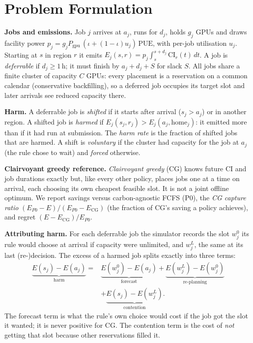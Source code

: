 \section{Problem Formulation}\label{sec:problem}

\textbf{Jobs and emissions.}
Job $j$ arrives at $a_j$, runs for $d_j$, holds $g_j$ GPUs and draws facility power
$p_j = g_j P_{\mathrm{gpu}}\,(\iota + (1-\iota)u_j)\,\mathrm{PUE}$, with per-job utilisation $u_j$.
Starting at $s$ in region $r$ it emits
$E_j(s,r) = p_j \int_s^{s+d_j} \mathrm{CI}_r(t)\,dt$.
A job is \emph{deferrable} if $d_j \ge 1$\,h; it must finish by $a_j + d_j + S$ for slack $S$.
All jobs share a finite cluster of capacity $C$ GPUs: every placement is a reservation on a common
calendar (conservative backfilling), so a deferred job occupies its target slot and later arrivals
see reduced capacity there.

\textbf{Harm.}
A deferrable job is \emph{shifted} if it starts after arrival ($s_j > a_j$) or in another region.
A shifted job is \emph{harmed} if $E_j(s_j, r_j) > E_j(a_j, \mathrm{home}_j)$: it emitted more than
if it had run at submission. The \emph{harm rate} is the fraction of shifted jobs that are harmed.
A shift is \emph{voluntary} if the cluster had capacity for the job at $a_j$ (the rule chose to
wait) and \emph{forced} otherwise.

\textbf{Clairvoyant greedy reference.} \emph{Clairvoyant greedy} (CG) knows future CI and job
durations exactly but, like every other policy, places jobs one at a time on arrival, each choosing
its own cheapest feasible slot. It is not a joint offline optimum. We report savings versus
carbon-agnostic FCFS (P0), the \emph{CG capture ratio} $(E_{P0}-E)/(E_{P0}-E_{\mathrm{CG}})$ (the
fraction of CG's saving a policy achieves), and regret $(E-E_{\mathrm{CG}})/E_{P0}$.

\textbf{Attributing harm.}
For each deferrable job the simulator records the slot $w^0_j$ its rule would choose at arrival
if capacity were unlimited, and $w^L_j$, the same at its last (re-)decision. The excess of a harmed
job splits exactly into three terms:
\begin{equation}\label{eq:decomp}
\begin{aligned}
\underbrace{E(s_j)-E(a_j)}_{\text{harm}} ={}&
\underbrace{E(w^0_j)-E(a_j)}_{\text{forecast}} +
\underbrace{E(w^L_j)-E(w^0_j)}_{\text{re-planning}}\\
&+ \underbrace{E(s_j)-E(w^L_j)}_{\text{contention}} .
\end{aligned}
\end{equation}
The forecast term is what the rule's own choice would cost if the job got the slot it wanted; it is
never positive for CG. The contention term is the cost of \emph{not} getting that slot because
other reservations filled it.
